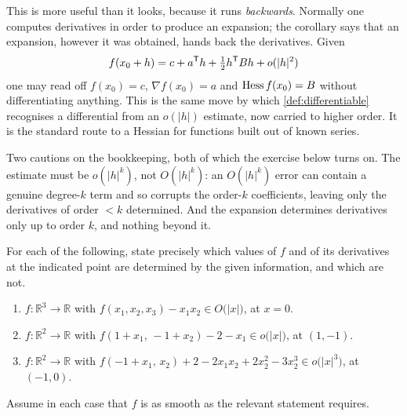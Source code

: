 \begin{remark}
\label{rem:reading_derivatives_off_expansions}
This is more useful than it looks, because it runs \emph{backwards}. Normally one computes
derivatives in order to produce an expansion; the corollary says that an expansion, however it
was obtained, hands back the derivatives. Given
\[f(x_0+h) = c + a^{\mathsf{T}} h + \tfrac12 h^{\mathsf{T}} Bh + o(\lvert h\rvert^2)\]
one may read off $f(x_0) = c$, $\nabla f(x_0) = a$ and $\operatorname{Hess} f(x_0) = B$ without differentiating
anything. This is the same move by which \cref{def:differentiable} recognises a differential from
an $o(\lvert h\rvert)$ estimate, now carried to higher order. It is the standard route to a Hessian
for functions built out of known series.

Two cautions on the bookkeeping, both of which the exercise below turns on. The estimate must be
$o(\lvert h\rvert^{k})$, not $O(\lvert h\rvert^{k})$: an $O(\lvert h\rvert^{k})$ error can
contain a genuine degree-$k$ term and so corrupts the order-$k$ coefficients, leaving only the
derivatives of order $< k$ determined. And the expansion determines derivatives only up to
order $k$, and nothing beyond it.
\end{remark}

\begin{exercise}
\label{ex:reading_off_expansions}
For each of the following, state precisely which values of $f$ and of its derivatives at the
indicated point are determined by the given information, and which are not.
\begin{enumerate}[label=\textbf{(\alph*)}]
  \item $f : \mathbb{R}^3 \to \mathbb{R}$ with
    $f(x_1,x_2,x_3) - x_1x_2 \in O\big(\lvert x\rvert\big)$, at $x = 0$.
  \item $f : \mathbb{R}^2 \to \mathbb{R}$ with
    $f(1+x_1,\,-1+x_2) - 2 - x_1 \in o\big(\lvert x\rvert\big)$, at $(1,-1)$.
  \item $f : \mathbb{R}^2 \to \mathbb{R}$ with
    $f(-1+x_1,\,x_2) + 2 - 2x_1x_2 + 2x_2^2 - 3x_2^3 \in o\big(\lvert x\rvert^3\big)$,
    at $(-1,0)$.
\end{enumerate}
Assume in each case that $f$ is as smooth as the relevant statement requires.
\end{exercise}

